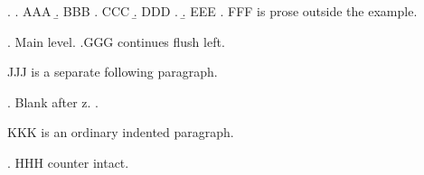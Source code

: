 

\ex.
\a. AAA
\b. BBB
\a. CCC
\b. DDD
\z.
\b. EEE
\z.
FFF is prose outside the example.

\ex. Main level. \z.GGG continues flush left.

JJJ is a separate following paragraph.

\ex. Blank after z. \z.

KKK is an ordinary indented paragraph.

\ex. HHH counter intact.

